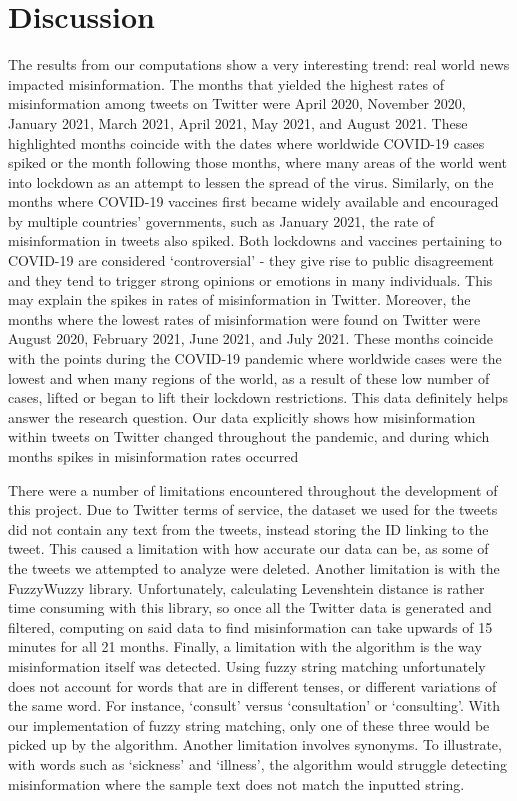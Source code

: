 \documentclass[fontsize=11pt]{article}
\begin{document}
    \section*{Discussion}
    \begin{flushleft}

        The results from our computations show a very interesting trend: real world news impacted misinformation. The months that yielded the highest rates of misinformation among tweets on Twitter were April 2020, November 2020, January 2021, March 2021, April 2021, May 2021, and August 2021. These highlighted months coincide with the dates where worldwide COVID-19 cases spiked or the month following those months, where many areas of the world went into lockdown as an attempt to lessen the spread of the virus. Similarly, on the months where COVID-19 vaccines first became widely available and encouraged by multiple countries' governments, such as January 2021, the rate of misinformation in tweets also spiked. Both lockdowns and vaccines pertaining to COVID-19 are considered `controversial' - they give rise to public disagreement and they tend to trigger strong opinions or emotions in many individuals. This may explain the spikes in rates of misinformation in Twitter. Moreover, the months where the lowest rates of misinformation were found on Twitter were August 2020, February 2021, June 2021, and July 2021. These months coincide with the points during the COVID-19 pandemic where worldwide cases were the lowest and when many regions of the world, as a result of these low number of cases, lifted or began to lift their lockdown restrictions. This data definitely helps answer the research question. Our data explicitly shows how misinformation within tweets on Twitter changed throughout the pandemic, and during which months spikes in misinformation rates occurred\hfill\break

        There were a number of limitations encountered throughout the development of this project. Due to Twitter terms of service, the dataset we used for the tweets did not contain any text from the tweets, instead storing the ID linking to the tweet. This caused a limitation with how accurate our data can be, as some of the tweets we attempted to analyze were deleted. Another limitation is with the FuzzyWuzzy library. Unfortunately, calculating Levenshtein distance is rather time consuming with this library, so once all the Twitter data is generated and filtered, computing on said data to find misinformation can take upwards of 15 minutes for all 21 months. Finally, a limitation with the algorithm is the way misinformation itself was detected. Using fuzzy string matching unfortunately does not account for words that are in different tenses, or different variations of the same word. For instance, `consult' versus `consultation' or `consulting'. With our implementation of fuzzy string matching, only one of these three would be picked up by the algorithm. Another limitation involves synonyms. To illustrate, with words such as `sickness' and `illness', the algorithm would struggle detecting misinformation where the sample text does not match the inputted string. \hfill\break


\end{flushleft}
\end{document}
